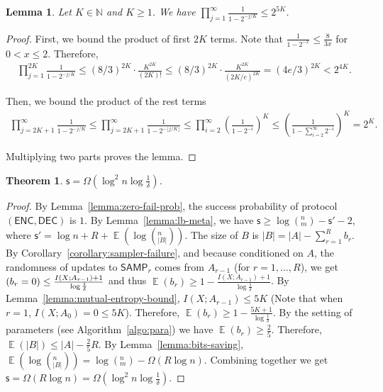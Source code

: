 \documentclass[10pt]{article}
\newtheorem{theorem}{Theorem}
\newtheorem{lemma}{Lemma}
\DeclareMathOperator*{\E}{\mathbb{E}}
\let\Pr\relax
\DeclareMathOperator*{\Pr}{\mathbb{P}}
\newcommand{\samp}{\textsf{SAMP}\xspace}
\newcommand{\enc}{\textsf{ENC}\xspace}
\newcommand{\dec}{\textsf{DEC}\xspace}
\newcommand{\s}{\textsf{s}\xspace}
\begin{document}
\begin{lemma}\label{lemma:Pochhammer}
  Let $K\in \mathbb{N}$ and $K\ge 1$. We have $\prod_{j=1}^{\infty} \frac{1}{1-2^{-j/K}}\le 2^{5K}$.
\end{lemma}

\begin{proof}
  First, we bound the product of first $2K$ terms. Note that $\frac{1}{1-2^{-x}}\le \frac{8}{3x}$ for $0<x\le 2$. Therefore, 
  \begin{align}
    \prod_{j=1}^{2K}\frac{1}{1-2^{-j/K}}
    \le (8/3)^{2K}\cdot \frac{K^{2K}}{(2K)!}
    \le (8/3)^{2K}\cdot \frac{K^{2K}}{(2K/e)^{2K}}
    = (4e/3)^{2K}
    < 2^{4K}. 
  \end{align}
  
  Then, we bound the product of the rest terms
  \begin{align}
    \prod_{j=2K+1}^{\infty}\frac{1}{1-2^{-j/K}} 
    \le \prod_{j=2K+1}^{\infty}\frac{1}{1-2^{-\lfloor j/K \rfloor}} 
    \le \prod_{i=2}^{\infty}\left( \frac{1}{1-2^{-i}}\right)^K 
    \le \left( \frac{1}{1-\sum_{i=2}^{\infty}2^{-i}}\right)^K
    = 2^K.
  \end{align}
  
  Multiplying two parts proves the lemma.
\end{proof}

\begin{theorem}
  $\s = \Omega(\log^2 n\log{\frac{1}{\delta}})$.
\end{theorem}

\begin{proof}
  By Lemma~\ref{lemma:zero-fail-prob}, the success probability of protocol $(\enc,\dec)$ is $1$. 
  By Lemma~\ref{lemma:lb-meta}, we have $\s\ge \log (^n_m) - \s' -2$, where $\s'=\log n + R+ \E(\log (^n_{|B|}))$. 
  The size of $B$ is $|B|=|A|-\sum_{r=1}^{R}{b_r}$.
  By Corollary~\ref{corollary:sampler-failure}, and because conditioned on $A$, the randomness of updates to $\samp_r$ comes from $A_{r-1}$ (for $r=1, \ldots, R$), we get $\Pr(b_r=0)\le \frac{I(X;A_{r-1})+1}{\log\frac{1}{\delta}}$ and thus $\E(b_r)\ge 1-\frac{I(X;A_{r-1})+1}{\log\frac{1}{\delta}}$. 
  By Lemma~\ref{lemma:mutual-entropy-bound}, $I(X;A_{r-1})\le 5K$ (Note that when $r=1$, $I(X;A_0)=0\le 5K$). Therefore, $\E(b_r)\ge 1-\frac{5K+1}{\log\frac{1}{\delta}}$.
  By the setting of parameters (see Algorithm~\ref{algo:para}) we have $\E(b_r)\ge \frac{2}{5}$. Therefore, $\E(|B|)\le |A|-\frac{2}{5}R$. 
  By Lemma~\ref{lemma:bits-saving}, $\E(\log (^n_{|B|}))=\log (^n_m)-\Omega(R\log n)$. 
  Combining together we get $\s=\Omega(R\log n)=\Omega(\log^2 n \log\frac{1}{\delta})$.
\end{proof}



\end{document}
